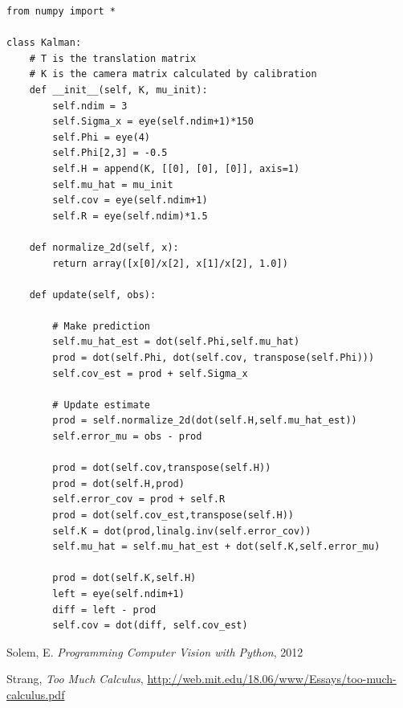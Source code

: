 \documentclass{article}
\begin{document}
\begin{verbatim}
from numpy import *

class Kalman:
    # T is the translation matrix
    # K is the camera matrix calculated by calibration
    def __init__(self, K, mu_init):
        self.ndim = 3
        self.Sigma_x = eye(self.ndim+1)*150
        self.Phi = eye(4)
        self.Phi[2,3] = -0.5
        self.H = append(K, [[0], [0], [0]], axis=1)
        self.mu_hat = mu_init
        self.cov = eye(self.ndim+1)
        self.R = eye(self.ndim)*1.5
        
    def normalize_2d(self, x): 
        return array([x[0]/x[2], x[1]/x[2], 1.0])
    
    def update(self, obs):

        # Make prediction
        self.mu_hat_est = dot(self.Phi,self.mu_hat) 
        prod = dot(self.Phi, dot(self.cov, transpose(self.Phi)))
        self.cov_est = prod + self.Sigma_x
                
        # Update estimate
        prod = self.normalize_2d(dot(self.H,self.mu_hat_est))
        self.error_mu = obs - prod
        
        prod = dot(self.cov,transpose(self.H))
        prod = dot(self.H,prod)
        self.error_cov = prod + self.R
        prod = dot(self.cov_est,transpose(self.H))
        self.K = dot(prod,linalg.inv(self.error_cov))
        self.mu_hat = self.mu_hat_est + dot(self.K,self.error_mu)
        
        prod = dot(self.K,self.H)
        left = eye(self.ndim+1) 
        diff = left - prod
        self.cov = dot(diff, self.cov_est)
\end{verbatim}

  

\begin{thebibliography}{1}

Solem, E. \emph{Programming Computer Vision with Python}, 2012

Strang, \emph{Too Much Calculus}, \url{http://web.mit.edu/18.06/www/Essays/too-much-calculus.pdf}

\end{thebibliography}
\end{document}
